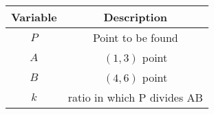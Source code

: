 \begin{tabular}[12pt]{ |c| c|}
    \hline
    \textbf{Variable} & \textbf{Description}\\ 
    \hline
    $P$ & Point to be found\\
    \hline
    $A$ & $(1,3)$ point\\
    \hline
    $B$ & $(4,6)$ point\\
    \hline
    $k$ & ratio in which P divides AB\\
    \hline
    \end{tabular}
